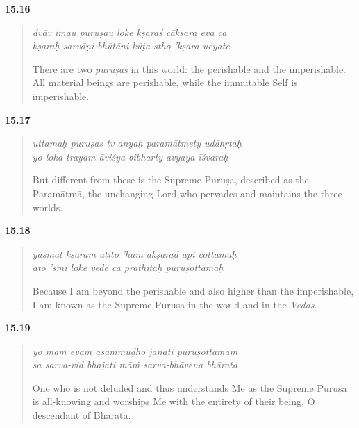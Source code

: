 \par\noindent\textbf{15.16}\par
\begin{verse}
\textit{dvāv imau puruṣau loke kṣaraś cākṣara eva ca} \\
\textit{kṣaraḥ sarvāṇi bhūtāni kūṭa-stho ’kṣara ucyate}

\noindent There are two \textit{puruṣas} in this world: the perishable and the imperishable. All material beings are perishable, while the immutable Self is imperishable.
\end{verse}
\par



\par\noindent\textbf{15.17}\par
\begin{verse}
\textit{uttamaḥ puruṣas tv anyaḥ paramātmety udāhṛtaḥ} \\
\textit{yo loka-trayam āviśya bibharty avyaya īśvaraḥ}

\noindent But different from these is the Supreme Puruṣa, described as the Paramātmā, the unchanging Lord who pervades and maintains the three worlds.
\end{verse}
\par



\par\noindent\textbf{15.18}\par
\begin{verse}
\textit{yasmāt kṣaram atīto ’ham akṣarād api cottamaḥ} \\
\textit{ato ’smi loke vede ca prathitaḥ puruṣottamaḥ}

\noindent Because I am beyond the perishable and also higher than the imperishable, I am known as the Supreme Puruṣa in the world and in the \textit{Vedas}.
\end{verse}
\par



\par\noindent\textbf{15.19}\par
\begin{verse}
\textit{yo mām evam asammūḍho jānāti puruṣottamam} \\
\textit{sa sarva-vid bhajati māṁ sarva-bhāvena bhārata}

\noindent One who is not deluded and thus understands Me as the Supreme Puruṣa is all-knowing and worships Me with the entirety of their being, O descendant of Bharata.
\end{verse}
\par



